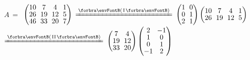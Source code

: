 \AExa $A\,=\,$ {\normalsize$\begin{pmatrix} 10 &\hspace{-4pt} 7 &\hspace{-4pt} 4 &\hspace{-4pt} 1 \\[-2pt] 26 &\hspace{-4pt} 19 &\hspace{-4pt} 12 &\hspace{-4pt} 5\\[-2pt] 46 &\hspace{-4pt} 33 &\hspace{-4pt} 20 &\hspace{-4pt} 7\end{pmatrix}$
	{$\xlongequal{\SmallPar{\text{I}}}$}
	$\begin{pmatrix} 1 &\hspace{-4pt} 0\\[-2pt] 0 &\hspace{-4pt} 1\\[-2pt] 2 &\hspace{-4pt} 1\end{pmatrix}\begin{pmatrix} 10 &\hspace{-4pt} 7 &\hspace{-4pt} 4 &\hspace{-4pt} 1\\[-2pt] 26 &\hspace{-4pt} 19 &\hspace{-4pt} 12 &\hspace{-4pt} 5\end{pmatrix}$
	{$\xlongequal{\SmallPar{\text{II}}}$}
	$\begin{pmatrix} 7 &\hspace{-4pt} 4\\[-2pt] 19 &\hspace{-4pt} 12\\[-2pt] 33 &\hspace{-4pt} 20\end{pmatrix}\begin{pmatrix} 2 &\hspace{-4pt} -1\\[-2pt] 1 &\hspace{-4pt} 0\\[-2pt] 0 &\hspace{-4pt} 1\\[-2pt] -1 &\hspace{-4pt} 2\end{pmatrix}$}\par\quad
